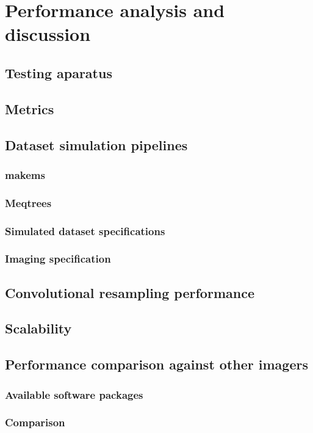 \chapter{Performance analysis and discussion}
\section{Testing aparatus}
\section{Metrics}
\section{Dataset simulation pipelines}
\subsection{makems}
\subsection{Meqtrees}
\subsection{Simulated dataset specifications}
\subsection{Imaging specification}
\section{Convolutional resampling performance}
\section{Scalability}
\section{Performance comparison against other imagers}
\subsection{Available software packages}
\subsection{Comparison}